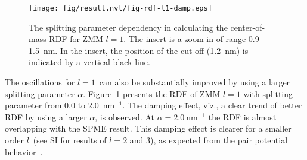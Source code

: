 \documentclass[a4paper,preprint,unsortedaddress,onecolumn,fleqn]{revtex4}
\begin{document}

\begin{figure}[tbp]
\centering
\texttt{[image: fig/result.nvt/fig-rdf-l1-damp.eps]}
\caption{ The splitting parameter dependency in calculating the
center-of-mass RDF for ZMM $l=1$. The insert is a zoom-in of range 0.9 --
1.5~nm. In the insert, the position of the cut-off (1.2~nm) is indicated by
a vertical black line. }
\label{fig:rdf-damp}
\end{figure}

The oscillations for $l=1$\ can also be substantially improved by using a
larger splitting parameter $\alpha $. Figure~\ref{fig:rdf-damp} presents the
RDF of ZMM $l=1$ with splitting parameter from $0.0$ to $2.0$~$\text{nm}%
^{-1} $. The damping effect, viz., a clear trend of better RDF by using a
larger $\alpha $, is observed. At $\alpha =2.0\ \text{nm}^{-1}$ the RDF is
almost overlapping with the SPME result. This damping effect is clearer for
a smaller order $l$\ (see SI for results of {$l=2$ and $3$}), as expected
from the pair potential behavior~\cite{fukuda2014zero}.

\end{document}
